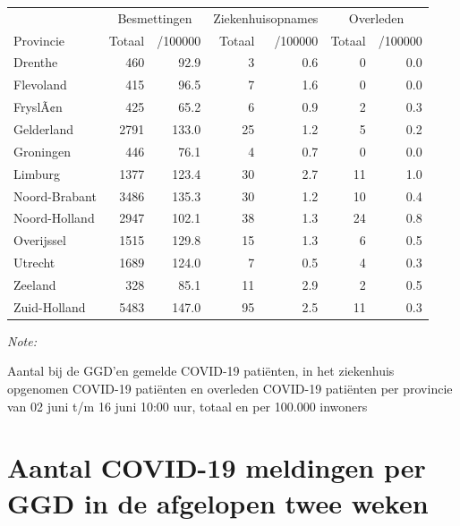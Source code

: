 \documentclass[
  english,
  man,floatsintext]{apa6}
\begin{document}
\begin{table}
\centering
\begin{threeparttable}
\begin{tabular}{lrrrrrr}
\toprule
\multicolumn{1}{c}{ } & \multicolumn{2}{c}{Besmettingen} & \multicolumn{2}{c}{Ziekenhuisopnames} & \multicolumn{2}{c}{Overleden} \\
\cmidrule(l{3pt}r{3pt}){2-3} \cmidrule(l{3pt}r{3pt}){4-5} \cmidrule(l{3pt}r{3pt}){6-7}
Provincie & Totaal & /100000 & Totaal & /100000 & Totaal & /100000\\
\midrule
Drenthe & 460 & 92.9 & 3 & 0.6 & 0 & 0.0\\
Flevoland & 415 & 96.5 & 7 & 1.6 & 0 & 0.0\\
FryslÃ¢n & 425 & 65.2 & 6 & 0.9 & 2 & 0.3\\
Gelderland & 2791 & 133.0 & 25 & 1.2 & 5 & 0.2\\
Groningen & 446 & 76.1 & 4 & 0.7 & 0 & 0.0\\
Limburg & 1377 & 123.4 & 30 & 2.7 & 11 & 1.0\\
Noord-Brabant & 3486 & 135.3 & 30 & 1.2 & 10 & 0.4\\
Noord-Holland & 2947 & 102.1 & 38 & 1.3 & 24 & 0.8\\
Overijssel & 1515 & 129.8 & 15 & 1.3 & 6 & 0.5\\
Utrecht & 1689 & 124.0 & 7 & 0.5 & 4 & 0.3\\
Zeeland & 328 & 85.1 & 11 & 2.9 & 2 & 0.5\\
Zuid-Holland & 5483 & 147.0 & 95 & 2.5 & 11 & 0.3\\
\bottomrule
\end{tabular}
\begin{tablenotes}
\item \textit{Note: } 
\item Aantal bij de GGD’en gemelde COVID-19 patiënten, in het ziekenhuis opgenomen COVID-19 patiënten en overleden COVID-19 patiënten per provincie van 02 juni t/m 16 juni 10:00 uur, totaal en per 100.000 inwoners
\end{tablenotes}
\end{threeparttable}
\end{table}

\newpage

\hypertarget{aantal-covid-19-meldingen-per-ggd-in-de-afgelopen-twee-weken}{%
\section{Aantal COVID-19 meldingen per GGD in de afgelopen twee weken}\label{aantal-covid-19-meldingen-per-ggd-in-de-afgelopen-twee-weken}}
\end{document}
